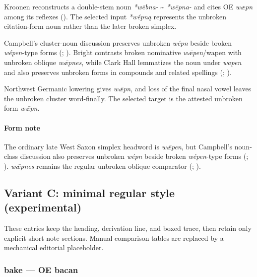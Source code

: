 \documentclass[
  british,
  a4paper,
]{article}
\begin{document}
Kroonen reconstructs a double-stem noun \emph{*wēbna-} \textasciitilde{}
\emph{*wēpna-} and cites OE \emph{wæpn} among its reflexes
(). The selected input
\emph{*wḗpną} represents the unbroken citation-form noun rather than the
later broken simplex.

Campbell's cluster-noun discussion preserves unbroken \emph{wépn} beside
broken \emph{wépen}-type forms (; ). Bright
contrasts broken nominative \emph{wǣpen}/wapen with unbroken oblique
\emph{wǣpnes}, while Clark Hall lemmatizes the noun under \emph{wapen}
and also preserves unbroken forms in compounds and related spellings
(;
).

Northwest Germanic lowering gives \emph{wǣpn}, and loss of the final
nasal vowel leaves the unbroken cluster word-finally. The selected
target is the attested unbroken form \emph{wǣpn}.

\paragraph{Form note}\label{form-note-5}

The ordinary late West Saxon simplex headword is \emph{wǣpen}, but
Campbell's noun-class discussion also preserves unbroken \emph{wépn}
beside broken \emph{wépen}-type forms
(;
). \emph{wǣpnes} remains the
regular unbroken oblique comparator
(;
).

\clearpage

\subsection{Variant C: minimal regular style
(experimental)}\label{variant-c-minimal-regular-style-experimental}

These entries keep the heading, derivation line, and boxed trace, then
retain only explicit short note sections. Manual comparison tables are
replaced by a mechanical editorial placeholder.

\subsubsection{bake --- OE bacan}\label{bake-oe-bacan-2}
\end{document}
